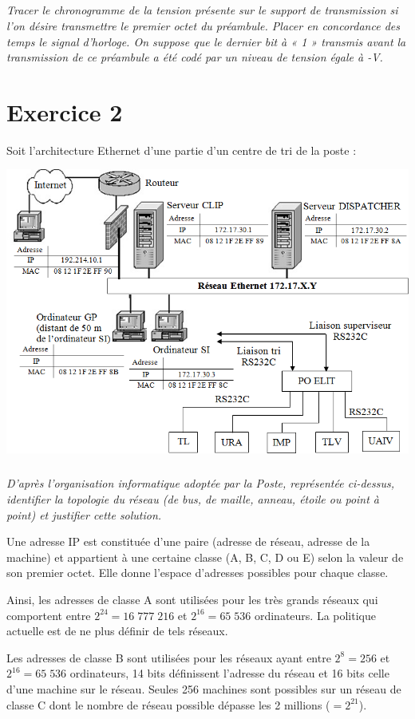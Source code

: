 \documentclass[10pt]{article}
\begin{document}
\subparagraph{}
\textit{Tracer le chronogramme de la tension présente sur le support de transmission si l'on désire transmettre le premier octet du préambule. Placer en concordance des temps le signal d'horloge. On suppose que le dernier bit à « 1 » transmis avant la transmission de ce préambule a été codé par un niveau de tension égale à -V.}

\section{Exercice 2}
\setcounter{subparagraph}{0}
Soit l’architecture Ethernet d’une partie d’un centre de tri de la poste :

\begin{center}
\includegraphics[width=.8\textwidth]{images/im_02}
\end{center}

\subparagraph{}
\textit{D’après l’organisation informatique adoptée par la Poste, représentée ci-dessus, identifier la topologie du réseau (de bus, de maille, anneau, étoile ou point à point) et justifier cette solution.}

Une adresse IP est constituée d'une paire (adresse de réseau, adresse de la machine) et appartient à une certaine classe (A, B, C, D ou E) selon la valeur de son premier octet. Elle donne l'espace d'adresses possibles pour chaque classe.

Ainsi, les adresses de classe A sont utilisées pour les très grands réseaux qui comportent entre $2^{24}=16\; 777\; 216$ et $2^{16}=65\; 536$ ordinateurs. La politique actuelle est de ne plus définir de tels réseaux.

Les adresses de classe B sont utilisées pour les réseaux ayant entre $2^8=256$ et $2^{16}=65\; 536$ ordinateurs, 14 bits définissent l'adresse du réseau et 16 bits celle d'une machine sur le réseau. Seules 256 machines sont possibles sur un réseau de classe C dont le nombre de réseau possible dépasse les 2 millions ($= 2^{21}$).
\end{document}
